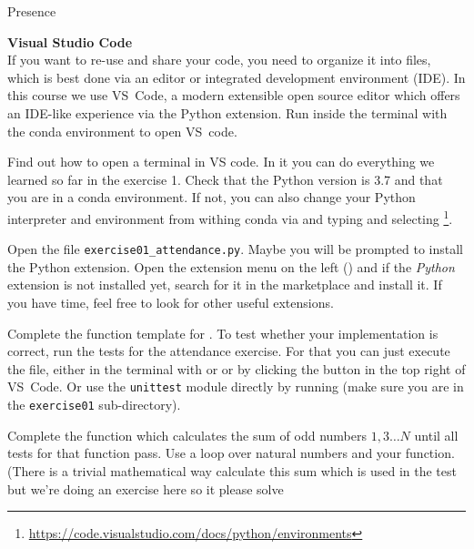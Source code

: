 \documentclass[a4paper, draft=False]{scrartcl}
\begin{document}
\begin{exam}[Presence]{Presence}
\begin{instructions}
        \begin{problem*}\textbf{Visual Studio Code}\\
          If you want to re-use and share your code, you need to organize it into
          files, which is best done via an editor or integrated development
          environment (IDE). In this course we use VS~Code, a modern extensible open
          source editor which offers an IDE-like experience via the Python extension.
          Run  inside the terminal with the conda environment to open
          VS~code.
          \begin{parts}
          \item Find out how to open a terminal in VS code. In it you can do
            everything we learned so far in the exercise 1. Check that the Python
            version is 3.7 and that you are in a conda environment. If not, you can
            also change your Python interpreter and environment from withing conda
            via  and typing and selecting \footnote{\url{https://code.visualstudio.com/docs/python/environments}}.
          \item Open the file \texttt{exercise01\_attendance.py}. Maybe you will be
            prompted to install the Python extension. Open the extension
            menu on the left () and if the \emph{Python} extension is
            not installed yet, search for it in the marketplace and install it.
            If you have time, feel free to look for other useful extensions.
          \item Complete the function template for . To test whether
            your implementation is correct, run the tests for the attendance
            exercise. For that you can just execute the file, either in the terminal
            with  or or by clicking the
            \menu{$\triangleright$} button in the top right of VS~Code. Or use the
            \texttt{unittest} module directly by running 
            (make sure you are in the \texttt{exercise01} sub-directory).
          \item Complete the function  which calculates the
            sum of odd numbers $1, 3 \ldots N$ until all tests for that function
            pass. Use a  loop over natural numbers and your 
            function. (There is a trivial mathematical way calculate this sum which
            is used in the test but we're doing an exercise here so it please solve

\end{parts}
\end{problem*}
\end{instructions}
\end{exam}
\end{document}
